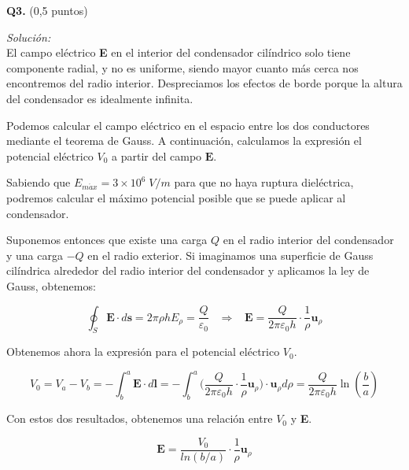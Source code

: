 \textbf{Q3.} (0,5 puntos)


\vspace{20px}
\textit{Solución:}
\\

El campo eléctrico \textbf{E} en el interior del condensador cilíndrico solo tiene componente radial, y no es uniforme, siendo mayor
cuanto más cerca nos encontremos del radio interior. Despreciamos los efectos de borde porque la altura del condensador es idealmente infinita.

Podemos calcular el campo eléctrico en el espacio entre los dos conductores mediante el teorema de Gauss. A continuación, calculamos
la expresión el potencial eléctrico $V_0$ a partir del campo $\mathbf{E}$.

Sabiendo que $E_{m\acute ax} = 3 \times 10^6\;V / m$ para que no haya ruptura dieléctrica, podremos calcular el máximo potencial posible que se
puede aplicar al condensador.

Suponemos entonces que existe una carga $Q$ en el radio interior del condensador y una carga $-Q$ en el radio exterior. Si imaginamos una
superficie de Gauss cilíndrica alrededor del radio interior del condensador y aplicamos la ley de Gauss, obtenemos:

\begin{equation*}
    \oint_{S} \mathbf{E} \cdot d\mathbf{s} = 2 \pi \rho h E_{\rho} = \frac{Q}{\varepsilon_0}
    \hspace{10pt} \Rightarrow \hspace{10pt}  \mathbf{E} = \frac{Q}{2 \pi \varepsilon_0 h}\cdot \frac{1}{\rho} \mathbf{u}_{\rho}
\end{equation*}

Obtenemos ahora la expresión para el potencial eléctrico $V_0$.

\begin{equation*}
    V_0 = V_{a} - V_{b} = - \int_{b}^{a} \mathbf{E} \cdot d\mathbf{l} =
    - \int_{b}^{a} \biggl( \frac{Q}{2 \pi \varepsilon_0 h}\cdot \frac{1}{\rho} \mathbf{u}_{\rho} \biggr) \cdot \mathbf{u}_{\rho} d\rho
    =  \frac{Q}{2 \pi \varepsilon_0 h} \ln(\frac{b}{a})
\end{equation*}

Con estos dos resultados, obtenemos una relación entre $V_0$ y \textbf{E}.

\begin{equation*}
    \mathbf{E} = \frac{V_0}{ln(b/a)} \cdot \frac{1}{\rho} \mathbf{u}_{\rho}
\end{equation*}


